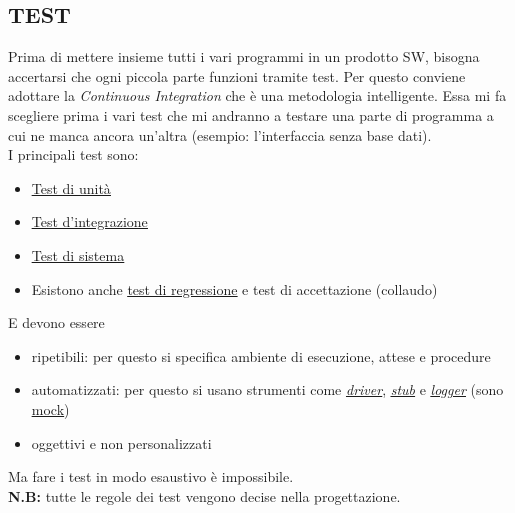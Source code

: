 		\subsection{TEST} 	\label{test}	%
		Prima di mettere insieme tutti i vari programmi in un prodotto SW, bisogna accertarsi che ogni piccola parte funzioni tramite test. %
		Per questo conviene adottare la \textit{Continuous Integration} che è una metodologia intelligente. Essa mi fa scegliere prima i vari test che mi andranno a testare una parte di programma a cui ne manca ancora un'altra (esempio: l'interfaccia senza base dati). \\
		I principali test sono:
		\begin{itemize}
			\item \underline{\hyperref[testunita]{Test di unità}}
			\item \underline{\hyperref[testintegrazione]{Test d'integrazione}}
			\item \underline{\hyperref[testsistema]{Test di sistema}}
			\item Esistono anche \underline{\hyperref[testregressione]{test di regressione}} e test di accettazione (collaudo)
		\end{itemize}
		E devono essere
		\begin{itemize}
			\item ripetibili: per questo si specifica ambiente di esecuzione, attese e procedure
			\item automatizzati: per questo si usano strumenti come \textit{\underline{\hyperref[driver]{driver}}}, \textit{\underline{\hyperref[stub]{stub}}} e \textit{\underline{\hyperref[logger]{logger}}} (sono \underline{\hyperref[mock]{mock}})
			\item oggettivi e non personalizzati
		\end{itemize}
		Ma fare i test in modo esaustivo è impossibile. \\
		\textbf{N.B:} tutte le regole dei test vengono decise nella progettazione.

